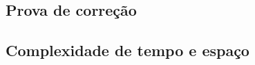
\subsection{Prova de correção}
\lipsum[19]

\subsection{Complexidade de tempo e espaço}
\lipsum[19]
